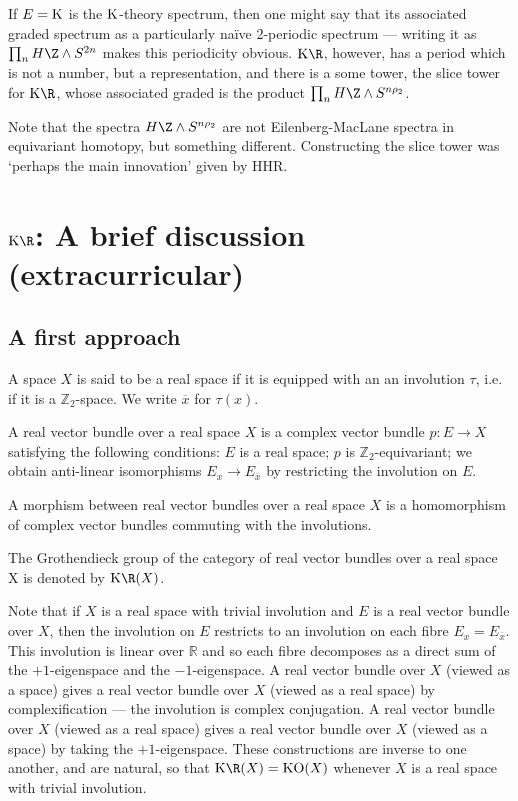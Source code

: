 \documentclass[11pt]{article}
\newcommand{\Extracurricular}[1]{
\section*{#1 {\small(extracurricular)}}
}
\begin{document}
If $E=\operatorname{{K}}$ is the $\operatorname{{K}}$-theory spectrum, then one might say that its associated
graded spectrum as a particularly na\"ive 2-periodic spectrum --- writing it as
$\prod_n {H\Z}\wedge S^{2n}$ makes this periodicity obvious. $\KR$, however, has
a period which is not a number, but a representation, and there is a some tower,
the slice tower for $\KR$, whose associated graded is the product $\prod_n
{H\Z}\wedge S^{n\rho_2}$.

Note that the spectra ${H\Z}\wedge S^{n\rho_2}$ are not Eilenberg-MacLane
spectra in equivariant homotopy, but something different. Constructing the slice
tower was `perhaps the main innovation' given by HHR.

\Extracurricular{$\KR$: A brief discussion}
\subsection*{A first approach}
\begin{defn*} A space $X$ is said to be a real space if it is equipped with an an involution $\tau$, i.e. if it is a $\mathbb{Z}_2$-space. We write $\overline{x}$ for $\tau(x)$.
\end{defn*}
\begin{defn*} A real vector bundle over a real space $X$ is a complex vector bundle $p:E\to X$ satisfying the following conditions: $E$ is a real space; $p$ is $\mathbb{Z}_2$-equivariant; we obtain anti-linear isomorphisms $E_x \to E_{\overline{x}}$ by restricting the involution on $E$.
\end{defn*}
\begin{defn*} 
A morphism between real vector bundles over a real space $X$ is a homomorphism of complex vector bundles commuting with the involutions.
\end{defn*}
\begin{defn*}
The Grothendieck group of the category of real vector bundles over a real space X is denoted by $\KR(X)$.
\end{defn*}
Note that if $X$ is a real space with trivial involution and $E$ is a real vector bundle over $X$, then the involution on $E$ restricts to an involution on each fibre $E_{x}=E_{\overline{x}}$. This involution is linear over $\mathbb{R}$ and so each fibre decomposes as a direct sum of the $+1$-eigenspace and the $-1$-eigenspace. A real vector bundle over $X$ (viewed as a space) gives a real vector bundle over $X$ (viewed as a real space) by complexification --- the involution is complex conjugation. A real vector bundle over $X$ (viewed as a real space) gives a real vector bundle over $X$ (viewed as a space) by taking the $+1$-eigenspace. These constructions are inverse to one another, and are natural, so that $\KR(X)=\KO(X)$ whenever $X$ is a real space with trivial involution.
\end{document}
